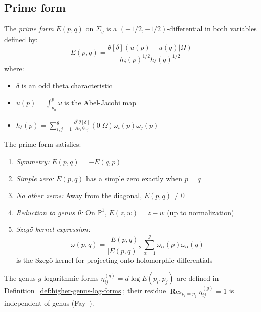 \subsection{Prime form}

\begin{definition}
\label{def:prime-form}
The \emph{prime form} $E(p, q)$ on $\Sigma_g$ is a $(-1/2, -1/2)$-differential in both variables defined by:
\begin{equation}
E(p, q) = \frac{\theta[\delta](u(p) - u(q)|\Omega)}{h_\delta(p)^{1/2} h_\delta(q)^{1/2}}
\end{equation}
where:
\begin{itemize}
\item $\delta$ is an odd theta characteristic
\item $u(p) = \int_{p_0}^p \omega$ is the Abel-Jacobi map
\item $h_\delta(p) = \sum_{i,j=1}^g \frac{\partial^2 \theta[\delta]}{\partial z_i \partial z_j}(0|\Omega) \omega_i(p) \omega_j(p)$
\end{itemize}
\end{definition}

\begin{theorem}
\label{thm:prime-form-properties}
The prime form satisfies:
\begin{enumerate}
\item \emph{Symmetry:} $E(p, q) = -E(q, p)$
\item \emph{Simple zero:} $E(p, q)$ has a simple zero exactly when $p = q$
\item \emph{No other zeros:} Away from the diagonal, $E(p, q) \neq 0$
\item \emph{Reduction to genus 0:} On $\mathbb{P}^1$, $E(z, w) = z - w$ (up to normalization)
\item \emph{Szegő kernel expression:}
\begin{equation}
\omega(p, q) = \frac{E(p, q)}{|E(p, q)|^2} \sum_{\alpha=1}^g \omega_\alpha(p) \overline{\omega_\alpha(q)}
\end{equation}
is the Szegő kernel for projecting onto holomorphic differentials
\end{enumerate}
\end{theorem}

The genus-$g$ logarithmic forms $\eta_{ij}^{(g)} = d\log E(p_i, p_j)$
are defined in Definition~\ref{def:higher-genus-log-forms}; their
residue $\operatorname{Res}_{p_i = p_j}\eta_{ij}^{(g)} = 1$ is
independent of genus (Fay~\cite{Fay73}).

